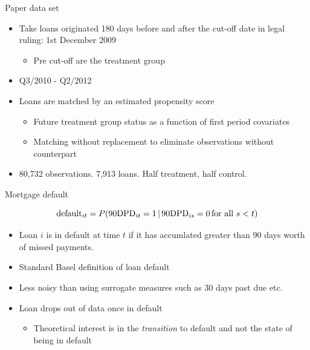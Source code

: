 \documentclass[ignorenonframetext,aspectratio=169]{beamer}
\providecommand{\tightlist}{%
  \setlength{\itemsep}{0pt}\setlength{\parskip}{0pt}}
\begin{document}
\begin{frame}{Paper data set}

\begin{itemize}
\item
  Take loans originated 180 days before and after the cut-off date in
  legal ruling: 1st December 2009

  \begin{itemize}
  \tightlist
  \item
    Pre cut-off are the treatment group
  \end{itemize}
\item
  Q3/2010 - Q2/2012
\item
  Loans are matched by an estimated propensity score

  \begin{itemize}
  \tightlist
  \item
    Future treatment group status as a function of first period
    covariates
  \item
    Matching without replacement to eliminate observations without
    counterpart
  \end{itemize}
\item
  80,732 observations. 7,913 loans. Half treatment, half control.
\end{itemize}

\end{frame}

\begin{frame}{Mortgage default}

\[
\textup{default}{}_{it}=P(90\textup{DPD}_{it}=1\,|\,90\textup{DPD}_{is}=0\textup{\,for all }s<t)
\]

\begin{itemize}
\item
  Loan \(i\) is in default at time \(t\) if it has accumlated greater
  than 90 days worth of missed payments.
\item
  Standard Basel definition of loan default
\item
  Less noisy than using surrogate measures such as 30 days past due etc.
\item
  Loan drops out of data once in default

  \begin{itemize}
  \tightlist
  \item
    Theoretical interest is in the \emph{transition} to default and not
    the state of being in default
  \end{itemize}
\end{itemize}

\end{frame}
\end{document}
